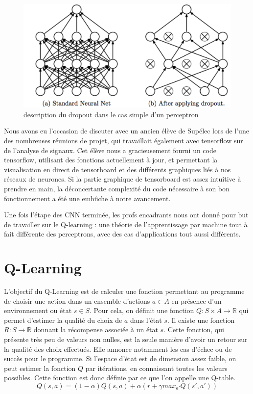 \documentclass[
    10pt,
    a4paper,
    oneside,
    headinclude,footinclude,
    BCOR=5mm,
    captions=tableabove
]{scrartcl}
\begin{document}
\begin{figure}[h!]
\includegraphics[width=\linewidth]{dropout.PNG}
\centering
\caption{description du dropout dans le cas simple d'un perceptron}
\label{fig:dropout.PNG}
\end{figure}


Nous avons eu l'occasion de discuter avec un ancien élève de Supélec lors de l'une des nombreuses réunions de projet, qui travaillait également avec tensorflow sur de l'analyse de signaux. Cet élève nous a gracieusement fourni un code tensorflow, utilisant des fonctions actuellement à jour, et permettant la visualisation en direct de tensorboard et des différents graphiques liés à nos réseaux de neurones. Si la partie graphique de tensorboard est assez intuitive à prendre en main, la déconcertante complexité du code nécessaire à son bon fonctionnement a été une embûche à notre avancement.

Une fois l'étape des CNN terminée, les profs encadrants nous ont donné pour but de travailler sur le Q-learning : une théorie de l'apprentissage par machine tout à fait différente des perceptrons, avec des cas d'applications tout aussi différents.
\vfill

\section{Q-Learning}

L'objectif du Q-Learning est de calculer une fonction permettant au programme de choisir une action dans un ensemble d'actions $a \in A$ en présence d'un environnement ou état $s \in S$. Pour cela, on définit une fonction $Q: S \times A \rightarrow \mathbb{R}$ qui permet d'estimer la qualité du choix de $a$ dans l'état $s$. Il existe une fonction $R: S \rightarrow \mathbb{R}$ donnant la récompense associée à un état $s$. Cette fonction, qui présente très peu de valeurs non nulles, est la seule manière d'avoir un retour sur la qualité des choix effectués. Elle annonce notamment les cas d'échec ou de succès pour le programme. Si l'espace d'état est de dimension assez faible, on peut estimer la fonction $Q$ par itérations, en connaissant toutes les valeurs possibles. Cette fonction est donc définie par ce que l'on appelle une Q-table.
 $$Q(s,a) = (1-\alpha) Q(s,a) + \alpha (r + \gamma max_{a'} Q(s',a') )$$
\end{document}
